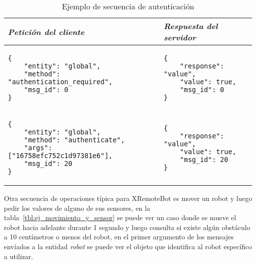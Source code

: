 \begin{table}
    \centering
    \begin{tabular}{|m{}|m{}|}
        \hline
        \textit{Petición del cliente} & \textit{Respuesta del servidor} \\
        \hline
\begin{Verbatim}[fontsize=\footnotesize]
{
    "entity": "global",
    "method": "authentication_required",
    "msg_id": 0
}
\end{Verbatim}
&
\begin{Verbatim}[fontsize=\footnotesize]
{
    "response": "value",
    "value": true,
    "msg_id": 0
}
\end{Verbatim}
\\
\hline
\begin{Verbatim}[fontsize=\footnotesize]
{
    "entity": "global",
    "method": "authenticate",
    "args": ["16758efc752c1d97381e6"],
    "msg_id": 20
}
\end{Verbatim}
&
\begin{Verbatim}[fontsize=\footnotesize]
{
    "response": "value",
    "value": true,
    "msg_id": 20
}
\end{Verbatim}
\\
\hline
    \end{tabular}
    \caption{Ejemplo de secuencia de autenticación}
    \label{tbl:ej_autenticacion}
\end{table}

Otra secuencia de operaciones típica para XRemoteBot es mover un robot
y luego pedir los valores de alguno de sus sensores, en la
tabla~\ref{tbl:ej_movimiento_y_sensor} se puede ver un caso donde se
mueve el robot hacia adelante durante 1 segundo y luego consulta si
existe algún obstáculo a 10 centímetros o menos del robot, en el primer
argumento de los mensajes
envíados a la entidad \textit{robot} se puede ver el objeto que identifica
al robot específico a utilizar.

